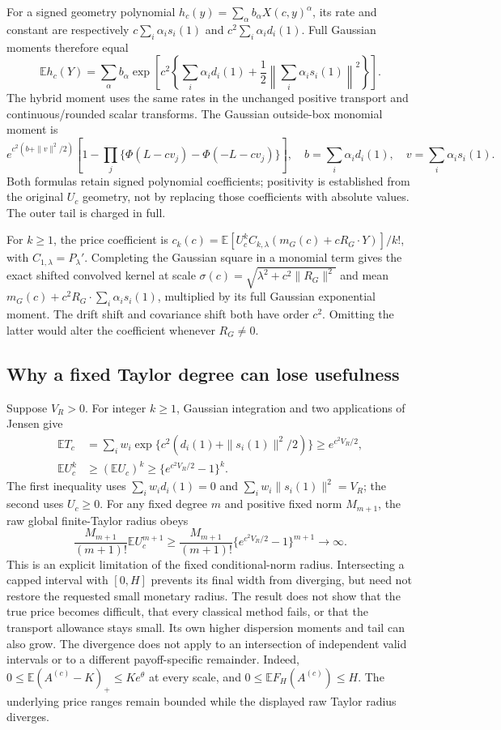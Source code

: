 For a signed geometry polynomial
$h_c(y)=\sum_\alpha b_\alpha X(c,y)^\alpha$, its rate and constant
are respectively $c\sum_i\alpha_is_i(1)$ and
$c^2\sum_i\alpha_id_i(1)$. Full Gaussian moments therefore equal
\[
 \mathbb E h_c(Y)=\sum_\alpha b_\alpha
 \exp\!\left[c^2\left\{\sum_i\alpha_id_i(1)
                    +\frac12\left\|\sum_i\alpha_is_i(1)\right\|^2\right\}\right].
\]
The hybrid moment uses the same rates in the unchanged positive
transport and continuous/rounded scalar transforms. The Gaussian
outside-box monomial moment is
\[
 e^{c^2(b+\|v\|^2/2)}
 \left[1-\prod_j\{\Phi(L-cv_j)-\Phi(-L-cv_j)\}\right],
 \quad b=\sum_i\alpha_id_i(1),\quad v=\sum_i\alpha_is_i(1).
\]
Both formulas retain signed polynomial coefficients; positivity is
established from the original $U_c$ geometry, not by replacing those
coefficients with absolute values. The outer tail is charged in full.

For $k\geq1$, the price coefficient is
$c_k(c)=\mathbb E[U_c^k C_{k,\lambda}(m_G(c)+cR_G\cdot Y)]/k!$,
with $C_{1,\lambda}=P_\lambda'$. Completing the Gaussian square in a
monomial term gives the exact shifted convolved kernel at scale
$\sigma(c)=\sqrt{\lambda^2+c^2\|R_G\|^2}$ and mean
$m_G(c)+c^2R_G\cdot\sum_i\alpha_is_i(1)$, multiplied by its full
Gaussian exponential moment. The drift shift and covariance shift both
have order $c^2$. Omitting the latter would alter the coefficient whenever
$R_G\ne0$.

\subsection{Why a fixed Taylor degree can lose usefulness}

Suppose $V_R>0$. For integer $k\geq1$, Gaussian integration and two
applications of Jensen give
\begin{align*}
 \mathbb E T_c
 &=\sum_iw_i\exp\{c^2(d_i(1)+\|s_i(1)\|^2/2)\}
   \geq e^{c^2V_R/2},\\
 \mathbb E U_c^k&\geq(\mathbb E U_c)^k
   \geq\{e^{c^2V_R/2}-1\}^k.
\end{align*}
The first inequality uses
$\sum_iw_id_i(1)=0$ and
$\sum_iw_i\|s_i(1)\|^2=V_R$; the second uses $U_c\geq0$.
For any fixed degree $m$ and positive fixed norm $M_{m+1}$, the raw
global finite-Taylor radius obeys
\[
 \frac{M_{m+1}}{(m+1)!}\mathbb E U_c^{m+1}
 \geq\frac{M_{m+1}}{(m+1)!}
          \{e^{c^2V_R/2}-1\}^{m+1}\longrightarrow\infty.
\]
This is an explicit limitation of the fixed conditional-norm radius.
Intersecting a capped interval with $[0,H]$ prevents its final width
from diverging, but need not restore the requested small monetary
radius. The result does not show that the true price becomes difficult,
that every classical method fails, or that the transport allowance stays
small. Its own higher dispersion moments and tail can also grow.
The divergence does not apply to an intersection of independent valid
intervals or to a different payoff-specific remainder. Indeed,
$0\leq\mathbb E(A^{(c)}-K)_+\leq K e^\theta$ at every scale,
and $0\leq\mathbb E F_H(A^{(c)})\leq H$. The underlying price ranges
remain bounded while the displayed raw Taylor radius diverges.

